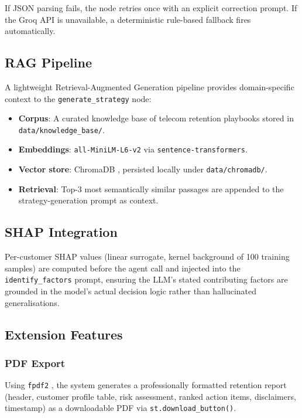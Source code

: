 \documentclass[conference]{IEEEtran}
\begin{document}
If JSON parsing fails, the node retries once with an explicit correction
prompt. If the Groq API is unavailable, a deterministic rule-based
fallback fires automatically.

\vspace{0.5em}
\subsection{RAG Pipeline}
\vspace{0.3em}

A lightweight Retrieval-Augmented Generation pipeline \cite{lewis2020rag}
provides domain-specific context to the \texttt{generate\_strategy} node:

\begin{itemize}
  \item \textbf{Corpus}: A curated knowledge base of telecom retention
        playbooks stored in \texttt{data/knowledge\_base/}.
  \item \textbf{Embeddings}: \texttt{all-MiniLM-L6-v2}
        \cite{reimers2019sentencebert} via \texttt{sentence-transformers}.
  \item \textbf{Vector store}: ChromaDB \cite{chromadb2023}, persisted
        locally under \texttt{data/chromadb/}.
  \item \textbf{Retrieval}: Top-3 most semantically similar passages are
        appended to the strategy-generation prompt as context.
\end{itemize}

\subsection{SHAP Integration}

Per-customer SHAP values (linear surrogate, kernel background of 100
training samples) are computed before the agent call and injected into
the \texttt{identify\_factors} prompt, ensuring the LLM's stated
contributing factors are grounded in the model's actual decision logic
rather than hallucinated generalisations.

\subsection{Extension Features}

\subsubsection*{PDF Export}
Using \texttt{fpdf2} \cite{fpdf2}, the system generates a professionally
formatted retention report (header, customer profile table, risk
assessment, ranked action items, disclaimers, timestamp) as a
downloadable PDF via \texttt{st.download\_button()}.
\end{document}
